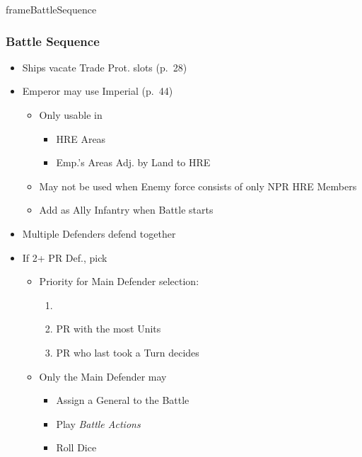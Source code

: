 \documentclass[10pt]{article}
\newlength{\fhBattleSequence} \setlength\fhBattleSequence{50\baselineskip}
\begin{document}
\begin{dynamiccontents*}{frameBattleSequence}\begin{eubox}{\fhBattleSequence}
	\begin{multicols}{2}
		\subsubsection*{Battle Sequence }
		\begin{itemize}
			\item Ships vacate Trade Prot. slots (p.~28)
		\end{itemize}
		\begin{itemize}
			\item Emperor may use Imperial \manpower (p.~44)
			\begin{itemize}
				\item Only usable in
				\begin{itemize}
					\item HRE Areas
					\item Emp.'s Areas Adj. by Land to HRE
				\end{itemize}
				\item May not be used when Enemy force consists of only NPR HRE Members
				\item Add as Ally Infantry when Battle starts
			\end{itemize}
			\item Multiple Defenders defend together
			\item If 2+ PR Def., pick 
			\begin{itemize}
				\item Priority for Main Defender selection:
				\begin{enumerate}
					\item {}
					\item PR with the most Units
					\item PR who last took a Turn decides
				\end{enumerate}
				\item Only the Main Defender may
				\begin{itemize}
					\item Assign a General to the Battle
					\item Play \emph{Battle Actions}
					\item Roll Dice

\end{itemize}
\end{itemize}
\end{itemize}
\end{multicols}
\end{eubox}
\end{dynamiccontents*}
\end{document}
